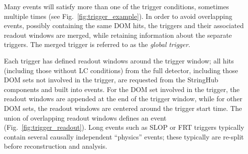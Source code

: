 Many events will satisfy more than one of the trigger conditions,
sometimes multiple times (see Fig.~\ref{fig:trigger_example}).  In order to
avoid overlapping events, possibly containing the same DOM hits, the
triggers and their associated readout windows are merged, while retaining
information about the separate triggers.  The merged trigger is referred to
as the \emph{global trigger}.   

Each trigger has defined readout windows around the trigger window;
all hits (including those without LC conditions) from the full detector,
including those DOM sets not involved in the trigger, are requested from
the StringHub components and built into events.  For the DOM set involved
in the trigger, the readout windows are appended at the end of the trigger
window, while for other DOM sets, the readout windows are centered around
the trigger start time.  The union of overlapping readout windows defines
an event (Fig.~\ref{fig:trigger_readout}).  Long events such as SLOP or FRT
triggers typically contain several causally independent ``physics'' events;
these typically are re-split before reconstruction and analysis.

